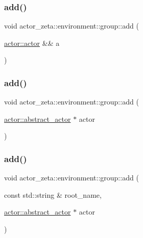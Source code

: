 \subsubsection{\texorpdfstring{add()}{add()}\hspace{0.1cm}{\footnotesize\ttfamily [1/3]}}
{\footnotesize\ttfamily void actor\+\_\+zeta\+::environment\+::group\+::add (\begin{DoxyParamCaption}\item[{\hyperlink{classactor__zeta_1_1actor_1_1actor}{actor\+::actor} \&\&}]{a }\end{DoxyParamCaption})}

\mbox{\label{classactor__zeta_1_1environment_1_1group_ac352dd63cc8d3bd54bff73487527d3f3}} 
\subsubsection{\texorpdfstring{add()}{add()}\hspace{0.1cm}{\footnotesize\ttfamily [2/3]}}
{\footnotesize\ttfamily void actor\+\_\+zeta\+::environment\+::group\+::add (\begin{DoxyParamCaption}\item[{\hyperlink{classactor__zeta_1_1actor_1_1abstract__actor}{actor\+::abstract\+\_\+actor} $\ast$}]{actor }\end{DoxyParamCaption})}

\mbox{\label{classactor__zeta_1_1environment_1_1group_aaccdf24ef556b75da7f479f40e140111}} 
\subsubsection{\texorpdfstring{add()}{add()}\hspace{0.1cm}{\footnotesize\ttfamily [3/3]}}
{\footnotesize\ttfamily void actor\+\_\+zeta\+::environment\+::group\+::add (\begin{DoxyParamCaption}\item[{const std\+::string \&}]{root\+\_\+name,  }\item[{\hyperlink{classactor__zeta_1_1actor_1_1abstract__actor}{actor\+::abstract\+\_\+actor} $\ast$}]{actor }\end{DoxyParamCaption})}


